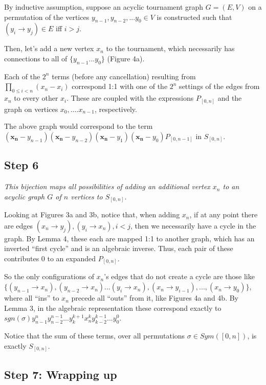 \documentclass[11pt, oneside]{article} 	%
\begin{document}
By inductive assumption, suppose an acyclic tournament graph $G = (E, V)$ on a permutation of the vertices $y_{n-1}, y_{n-2}, ... y_0 \in V$ is constructed such that $(y_i \rightarrow y_j) \in E$ iff $i > j$.

Then, let's add a new vertex $x_n$ to the tournament, which necessarily has connections to all of $\{y_{n-1}...y_0\}$ (Figure 4a).


Each of the $2^n$ terms (before any cancellation) resulting from $\prod_{0 \leq i < n}(x_n-x_i)$ correspond 1:1 with one of the $2^n$ settings of the edges from $x_n$ to every other $x_i$.  These are coupled with the expressions $P_{[0,n]}$ and the graph on vertices $x_0, .... x_{n-1}$, respectively.

The above graph would correspond to the term $(\mathbf{x_n}-y_{n-1})(\mathbf{x_n}-y_{n-2})(\mathbf{x_n}-y_{1})(\mathbf{x_n}-y_{0})P_{[0,n-1]}$ in $S_{[0,n]}$.


\subsection{Step 6}

\emph{This bijection maps all possibilities of adding an additional vertex $x_n$ to an acyclic graph $G$ of $n$ vertices to $S_{[0,n]}$.}

Looking at Figures 3a and 3b, notice that, when adding $x_n$, if at any point there are edges $(x_n \rightarrow y_{j}), (y_{i} \rightarrow x_n), i < j$, then we necessarily have a cycle in the graph.  By Lemma 4, these each are mapped 1:1 to another graph, which has an inverted ``first cycle'' and is an algebraic inverse.  Thus, each pair of these contributes $0$ to an expanded $P_{[0,n]}$.

So the only configurations of $x_n$'s edges that do not create a cycle are those like $\{(y_{n-1} \rightarrow x_n), (y_{n-2} \rightarrow x_n) ... (y_i \rightarrow x_n), (x_n \rightarrow y_{i-1}), ...,(x_n \rightarrow y_0) \}$, where all ``ins'' to $x_n$ precede all ``outs'' from it, like Figures 4a and 4b. By Lemma 3, in the algebraic representation these correspond exactly to $sgn(\sigma) y_{n-1}^{n}y_{n-2}^{n-1}...y_{k}^{k+1}x_n^ky_{k-2}^{k-1}...y_0^0$. 

Notice that the sum of these terms, over all permutations $\sigma \in Sym([0,n])$, is exactly $S_{[0,n]}$. 


\subsection{Step 7: Wrapping up}
\end{document}
